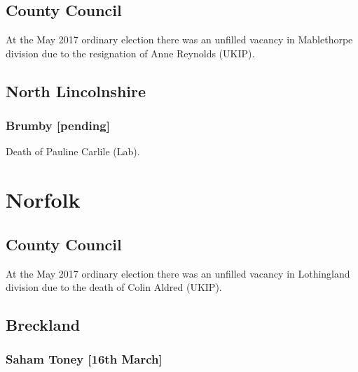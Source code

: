\documentclass[a4paper,openany]{book}
\begin{document}
\begin{resultsiii}
\subsection*{County Council}

At the May 2017 ordinary election there was an unfilled vacancy in Mablethorpe division due to the resignation of Anne Reynolds (UKIP).

\subsection*{North Lincolnshire}

\subsubsection*{Brumby \hspace*{\fill}\nolinebreak[1]%
\enspace\hspace*{\fill}
[pending]}


Death of Pauline Carlile (Lab).

\section{Norfolk}

\subsection*{County Council}

At the May 2017 ordinary election there was an unfilled vacancy in Lothingland division due to the death of Colin Aldred (UKIP).

\subsection*{Breckland}

\subsubsection*{Saham Toney \hspace*{\fill}\nolinebreak[1]%
\enspace\hspace*{\fill}
[16th March]}



\end{resultsiii}
\end{document}
